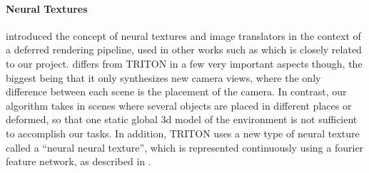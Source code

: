 \documentclass{article}
\begin{document}
\vspace{-8pt}
\paragraph{Neural Textures}
\citet{deferred_neural_rendering} introduced the concept of neural textures and image translators in the context of a deferred rendering pipeline, used in other works such as \cite{surgical_video_translation} which is closely related to our project. 
\citet{surgical_video_translation} differs from TRITON in a few very important aspects though, the biggest being that it only synthesizes new camera views, where the only difference between each scene is the placement of the camera. In contrast, our algorithm takes in scenes where several objects are placed in different places or deformed, so that one static  global 3d model of the environment is not sufficient to accomplish our tasks. In addition, TRITON uses a new type of neural texture called a ``neural neural texture'', which is represented continuously using a fourier feature network, as described in \citep{fourier_feature_networks}.













\end{document}
